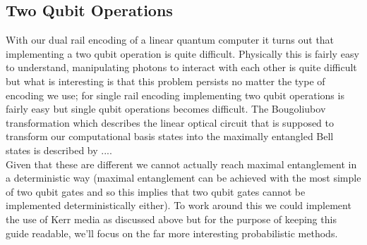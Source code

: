 \subsection{Two Qubit Operations}
With our dual rail encoding of a linear quantum computer it turns out that implementing a two qubit operation is quite difficult. Physically this is fairly easy to understand, manipulating photons to interact with each other is quite difficult but what is interesting is that this problem persists no matter the type of encoding we use; for single rail encoding implementing two qubit operations is fairly easy but single qubit operations becomes difficult. The Bougoliubov transformation which describes the linear optical circuit that is supposed to transform our computational basis states into the maximally entangled Bell states is described by .... \\ Given that these are different we cannot actually reach maximal entanglement in a deterministic way (maximal entanglement can be achieved with the most simple of two qubit gates and so this implies that two qubit gates cannot be implemented deterministically either). To work around this we could implement the use of Kerr media as discussed above but for the purpose of keeping this guide readable, we'll focus on the far more interesting probabilistic methods.



